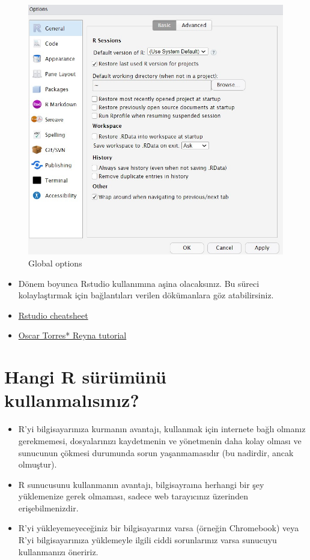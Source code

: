 \documentclass[
  oneside]{book}
\begin{document}
\begin{figure}

{\centering \includegraphics[width=1\linewidth]{images/global_options} 

}

\caption{Global options}\label{fig:img-options}
\end{figure}

\begin{itemize}
\item
  Dönem boyunca Rstudio kullanımına aşina olacaksınız. Bu süreci kolaylaştırmak için bağlantıları verilen dökümanlara göz atabilirsiniz.
\item
  \href{Kaynaklar/rstudio-ide.pdf}{Rstudio cheatsheet}
\item
  \href{Kaynaklar/rstudio_tutorial.pdf}{Oscar Torres* Reyna tutorial}
\end{itemize}

\hypertarget{hangi-r-suxfcruxfcmuxfcnuxfc-kullanmalux131sux131nux131z}{%
\section{Hangi R sürümünü kullanmalısınız?}\label{hangi-r-suxfcruxfcmuxfcnuxfc-kullanmalux131sux131nux131z}}

\begin{itemize}
\item
  R'yi bilgisayarınıza kurmanın avantajı, kullanmak için internete bağlı olmanız gerekmemesi, dosyalarınızı kaydetmenin ve yönetmenin daha kolay olması ve sunucunun çökmesi durumunda sorun yaşanmamasıdır (bu nadirdir, ancak olmuştur).
\item
  R sunucusunu kullanmanın avantajı, bilgisayraına herhangi bir şey yüklemenize gerek olmaması, sadece web tarayıcınız üzerinden erişebilmenizdir.
\item
  R'yi yükleyemeyeceğiniz bir bilgisayarınız varsa (örneğin Chromebook) veya R'yi bilgisayarınıza yüklemeyle ilgili ciddi sorunlarınız varsa sunucuyu kullanmanızı öneririz.
\end{itemize}
\end{document}
